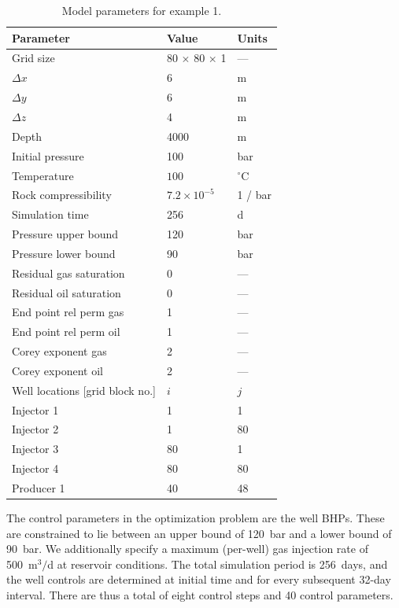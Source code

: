 %
\begin{table}
\tabcolsep=0pt
\centering
\caption{Model parameters for example 1.}
\label{table:PI}
\begin{tabular*}{84mm}{@{\extracolsep\fill}lll}\toprule
Parameter                & Value    & Units \\
\midrule
Grid size                & 80 $\times$ 80 $\times$ 1 &  ---  \\
$\Delta x$               & 6 &m          \\
$\Delta y$               & 6 &m          \\
$\Delta z$               & 4&m         \\
Depth                    & 4000&m           \\
Initial pressure         & 100  & bar        \\
Temperature              &$100$ & $^\circ$C     \\
Rock compressibility     & $7.2 \times 10^{-5}$ & 1 / bar \\
Simulation time          &256 & d           \\
Pressure upper bound     & 120 & bar        \\
Pressure lower bound     &  90 & bar        \\
Residual gas saturation  & 0 & ---          \\
Residual oil saturation  & 0 & ---          \\ 
 End point rel perm gas   & 1 & ---          \\
End point rel perm oil   & 1 & ---          \\
Corey exponent gas       & 2 & ---          \\
Corey exponent oil       & 2 & ---          \\[2pt]
\bottomrule
Well locations [grid block no.] & $i$ & $j$ \\
\midrule
Injector 1               &   1&  1   \\
Injector 2               &   1& 80   \\
Injector 3               &  80&  1   \\
Injector 4               &  80& 80   \\
Producer 1               &  40& 48   \\[2pt]
\bottomrule
\end{tabular*}
\end{table}
%



The control parameters in the optimization problem are the well BHPs. These are constrained to lie between an
upper bound of 120~bar and a lower bound of 90~bar. We additionally specify a
maximum (per-well) gas injection rate of 500~m$^3/$d at reservoir conditions.
The total simulation period is 256~days, and the well controls are determined
at initial time and for every subsequent 32-day interval. There are thus a
total of eight control steps and 40 control parameters.

